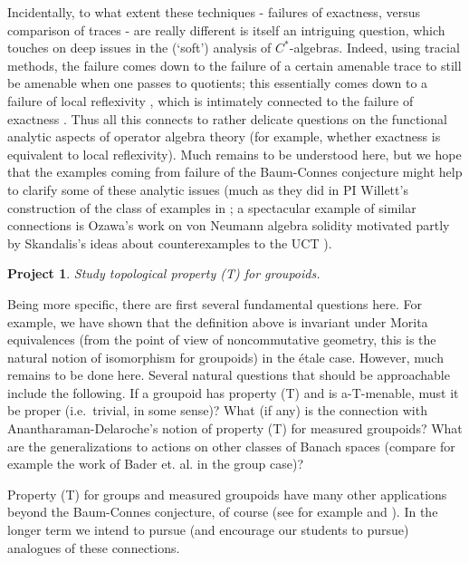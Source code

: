\documentclass[11pt]{article}
\theoremstyle{plain}
\newtheorem{project}[theorem]{Project}
\theoremstyle{definition}
\theoremstyle{remark}
\begin{document}
Incidentally, to what extent these techniques - failures of exactness, versus comparison of traces - are really different is itself an intriguing question, which touches on deep issues in the (`soft') analysis of $C^*$-algebras.  Indeed, using tracial methods, the failure comes down to the failure of a certain amenable trace \cite[Chapter 6]{Brown:2008qy} to still be amenable when one passes to quotients; this essentially comes down to a failure of local reflexivity \cite[Chapter 9]{Brown:2008qy}, which is intimately connected to the failure of exactness \cite[Chapter 5]{Brown:2008qy}.  Thus all this connects to rather delicate questions on the functional analytic aspects of operator algebra theory (for example, whether exactness is equivalent to local reflexivity).  Much remains to be understood here, but we hope that the examples coming from failure of the Baum-Connes conjecture might help to clarify some of these analytic issues (much as they did in PI Willett's construction of the class of examples in \cite{Spakula:2013ys}; a spectacular example of similar connections is Ozawa's \cite{Ozawa:2004bf} work on von Neumann algebra solidity motivated partly by Skandalis's ideas about counterexamples to the UCT \cite{Skandalis:1988rr}).


\begin{project}
Study topological property (T) for groupoids.
\end{project}

Being more specific, there are first several fundamental questions here.  For example, we have shown that the definition above is invariant under Morita equivalences (from the point of view of noncommutative geometry, this is the natural notion of isomorphism for groupoids) in the \'{e}tale case.  However, much remains to be done here.  Several natural questions that should be approachable include the following.  If a groupoid has property (T) and is a-T-menable, must it be proper (i.e.\ trivial, in some sense)?  What (if any) is the connection with Anantharaman-Delaroche's notion of property (T) for measured groupoids?  What are the generalizations to actions on other classes of Banach spaces (compare for example the work of Bader et. al. \cite{Bader:2007eg} in the group case)?

Property (T) for groups and measured groupoids have many other applications beyond the Baum-Connes conjecture, of course (see for example \cite[Chapter 6]{Bekka:2000kx} and \cite{Zimmer:2981ds}).  In the longer term we intend to pursue (and encourage our students to pursue) analogues of these connections.  
\end{document}
